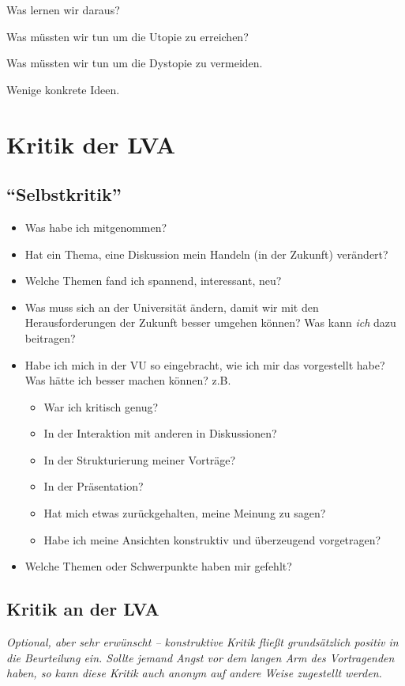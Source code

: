 \documentclass[twoside, a4paper, DIV=11, open=any, bibliography=totoc]{scrbook}
\begin{document}
Was lernen wir daraus?

Was müssten wir tun um die Utopie zu erreichen?

Was müssten wir tun um die Dystopie zu vermeiden.

Wenige konkrete Ideen.



\chapter{Kritik der LVA} \label{chap:lvakritik}

\section{"`Selbstkritik"'}

\begin{itemize}
    \item Was habe ich mitgenommen?
    \item Hat ein Thema, eine Diskussion mein Handeln (in der Zukunft) verändert?
    \item Welche Themen fand ich spannend, interessant, neu?
    \item Was muss sich an der Universität ändern, damit wir mit den Herausforderungen der Zukunft besser umgehen können? Was kann \textit{ich} dazu beitragen?
    \item Habe ich mich in der VU so eingebracht, wie ich mir das vorgestellt habe? Was hätte ich besser machen können? z.B.
    \begin{itemize}
        \item War ich kritisch genug?
        \item In der Interaktion mit anderen in Diskussionen?
        \item In der Strukturierung meiner Vorträge?
        \item In der Präsentation?
        \item Hat mich etwas zurückgehalten, meine Meinung zu sagen?
        \item Habe ich meine Ansichten konstruktiv und überzeugend vorgetragen?
    \end{itemize}
    \item Welche Themen oder Schwerpunkte haben mir gefehlt?
\end{itemize}


\section{Kritik an der LVA} \label{sec:}
\textit{Optional, aber sehr erwünscht -- konstruktive Kritik fließt grundsätzlich positiv in die Beurteilung ein. Sollte jemand Angst vor dem langen Arm des Vortragenden haben, so kann diese Kritik auch anonym auf andere Weise zugestellt werden.}
\end{document}
